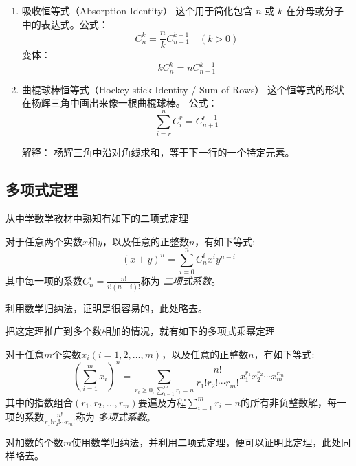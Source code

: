 \begin{enumerate}
    解释： 从 \(m\) 个男性和 \(n\) 个女性中挑选一个由 \(r\) 个人组成的委员会，
    可以通过从男性中选 \(k\) 个、从女性中选 \(r-k\) 个的所有可能方式加总得到。

  \item 吸收恒等式（Absorption Identity）
    这个用于简化包含 \(n\) 或 \(k\) 在分母或分子中的表达式。公式：
    \[{C_n^k} = \frac{n}{k}{C_{n-1}^{k-1}} \quad (k>0)\]
    变体：\[k{C_n^k}=n{C_{n-1}^{k-1}}\]

  \item 曲棍球棒恒等式（Hockey-stick Identity / Sum of Rows）
    这个恒等式的形状在杨辉三角中画出来像一根曲棍球棒。
    公式：\[\sum _{i=r}^{n}{C_i^r}=C_{n+1}^{r+1}\]

    解释： 杨辉三角中沿对角线求和，等于下一行的一个特定元素。
\end{enumerate}

\subsection{多项式定理}
\label{sec:polynomial-theorem}

从中学数学教材中熟知有如下的二项式定理
\begin{theorem}[二项式定理]
  对于任意两个实数$x$和$y$，以及任意的正整数$n$，有如下等式:
  \begin{equation}
    \label{eq:binomial-theorem}
    (x+y)^n = \sum_{i=0}^n C_n^i x^iy^{n-i}
  \end{equation}
  其中每一项的系数$C_n^i=\frac{n!}{i!(n-i)!}$称为 \emph{二项式系数}。
\end{theorem}

利用数学归纳法，证明是很容易的，此处略去。

把这定理推广到多个数相加的情况，就有如下的多项式乘幂定理
\begin{theorem}[多项式乘幂定理]
  对于任意$m$个实数$x_i(i=1,2,\ldots,m)$，以及任意的正整数$n$，有如下等式:
  \begin{equation}
    \label{eq:polynomial-theorem}
    \left( \sum_{i=1}^m x_i \right)^n = \sum_{r_{i} \geqslant 0,\sum_{i=1}^{m}r_{i}=n} \frac{n!}{r_1!r_2!\cdots r_m!}x_1^{r_1}x_2^{r_2}\cdots x_m^{r_m}
  \end{equation}
  其中的指数组合$(r_1,r_2,\ldots,r_{m})$要遍及方程$\sum_{i=1}^{m}r_{i}=n$的所有非负整数解，每一项的系数$\frac{n!}{r_1!r_{2}!\cdots r_{m}!}$称为 \emph{多项式系数}。
\end{theorem}

对加数的个数$m$使用数学归纳法，并利用二项式定理，便可以证明此定理，此处同样略去。

